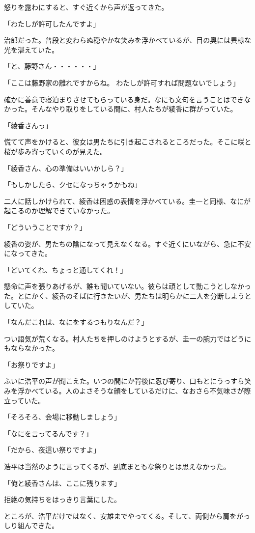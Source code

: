 ﻿\documentclass[book,tate]{jlreq}
\begin{document}
怒りを露わにすると、すぐ近くから声が返ってきた。

「わたしが許可したんですよ」

治郎だった。普段と変わらぬ穏やかな笑みを浮かべているが、目の奥には異様な光を湛えていた。

「と、藤野さん・・・・・・」

「ここは藤野家の離れですからね。 わたしが許可すれば問題ないでしょう」

確かに善意で寝泊まりさせてもらっている身だ。なにも文句を言うことはできなかった。そんなやり取りをしている間に、村人たちが綾香に群がっていた。

「綾香さんっ」

慌てて声をかけると、彼女は男たちに引き起こされるところだった。そこに咲と桜が歩み寄っていくのが見えた。

「綾香さん、心の準備はいいかしら？」

「もしかしたら、クセになっちゃうかもね」

二人に話しかけられて、綾香は困惑の表情を浮かべている。圭一と同様、なにが起こるのか理解できていなかった。

「どういうことですか？」

綾香の姿が、男たちの陰になって見えなくなる。すぐ近くにいながら、急に不安になってきた。

「どいてくれ、ちょっと通してくれ！」

懸命に声を張りあげるが、誰も聞いていない。彼らは頑として動こうとしなかった。とにかく、綾香のそばに行きたいが、男たちは明らかに二人を分断しようとしていた。

「なんだこれは、なにをするつもりなんだ？」

つい語気が荒くなる。村人たちを押しのけようとするが、圭一の腕力ではどうにもならなかった。

「お祭りですよ」

ふいに浩平の声が聞こえた。いつの間にか背後に忍び寄り、口もとにうっすら笑みを浮かべている。人のよさそうな顔をしているだけに、なおさら不気味さが際立っていた。

「そろそろ、会場に移動しましょう」

「なにを言ってるんです？」

「だから、夜這い祭りですよ」

浩平は当然のように言ってくるが、到底まともな祭りとは思えなかった。

「俺と綾香さんは、ここに残ります」

拒絶の気持ちをはっきり言葉にした。

ところが、浩平だけではなく、安雄までやってくる。そして、両側から肩をがっしり組んできた。
\end{document}
